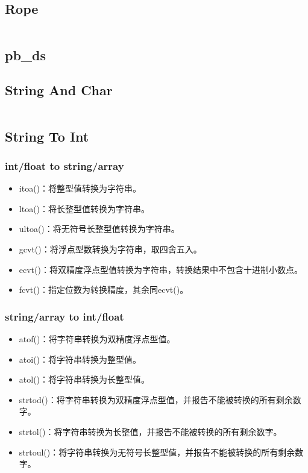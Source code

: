 \documentclass[a4paper,13.6pt]{article}
\begin{document}
\begin{CJK}{UTF8}{gbsn}
\subsection{Rope} 
\inputminted{c++}{../ACM_Template/Operation/gnu_rope.cpp}

\subsection{pb\_ds} 


\subsection{String And Char}
\inputminted{c++}{../ACM_Template/Operation/StringAndChar.cpp}

\subsection{String To Int}
\subsubsection*{int/float to string/array}
\begin{itemize}
\item itoa()：将整型值转换为字符串。
\item ltoa()：将长整型值转换为字符串。
\item ultoa()：将无符号长整型值转换为字符串。
\item gcvt()：将浮点型数转换为字符串，取四舍五入。
\item ecvt()：将双精度浮点型值转换为字符串，转换结果中不包含十进制小数点。
\item fcvt()：指定位数为转换精度，其余同ecvt()。
\end{itemize}

\subsubsection*{string/array to int/float}
\begin{itemize}
\item atof()：将字符串转换为双精度浮点型值。
\item atoi()：将字符串转换为整型值。
\item atol()：将字符串转换为长整型值。
\item strtod()：将字符串转换为双精度浮点型值，并报告不能被转换的所有剩余数字。
\item strtol()：将字符串转换为长整值，并报告不能被转换的所有剩余数字。
\item strtoul()：将字符串转换为无符号长整型值，并报告不能被转换的所有剩余数字。
\end{itemize}



\end{CJK}
\end{document}
